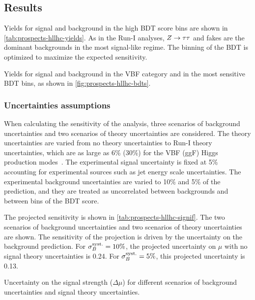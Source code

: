 \subsection{Results}

Yields for signal and background in the high BDT score bins are shown in \cref{tab:prospects-hllhc-yields}. As in the Run-I analyses, $Z\rightarrow\tau\tau$ and fakes are the dominant backgrounds in the most signal-like regime. The binning of the BDT is optimized to maximize the expected sensitivity.

\begin{table}[bp]
  \centering
  \renewcommand{\arraystretch}{1.4}
  \caption{Yields for signal and background in the VBF category and in the most sensitive BDT bins, as shown in \cref{fig:prospects-hllhc-bdts}.}
  
  \label{tab:prospects-hllhc-yields}
\end{table}

\subsubsection{Uncertainties assumptions}

When calculating the sensitivity of the analysis, three scenarios of background uncertainties and two scenarios of theory uncertainties are considered. The theory uncertainties are varied from no theory uncertainties to Run-I theory uncertainties, which are as large as 6\% (30\%) for the VBF (ggF) Higgs production modes~\cite{HIGG-2013-32}. The experimental signal uncertainty is fixed at 5\% accounting for experimental sources such as jet energy scale uncertainties. The experimental background uncertainties are varied to 10\% and 5\% of the prediction, and they are treated as uncorrelated between backgrounds and between bins of the BDT score.

The projected sensitivity is shown in \cref{tab:prospects-hllhc-signif}. The two scenarios of background uncertainties and two scenarios of theory uncertainties are shown. The sensitivity of the projection is driven by the uncertainty on the background prediction. For $\sigma_{B}^{\text{syst.}} = 10\%$, the projected uncertainty on $\mu$ with no signal theory uncertainties is 0.24. For $\sigma_{B}^{\text{syst.}} = 5\%$, this projected uncertainty is 0.13.

\begin{table}[bp]
  \centering
  \renewcommand{\arraystretch}{1.4}
  \caption{Uncertainty on the signal strength ($\Delta\mu$) for different scenarios of background uncertainties and signal theory uncertainties.}
  
  \label{tab:prospects-hllhc-signif}
\end{table}


